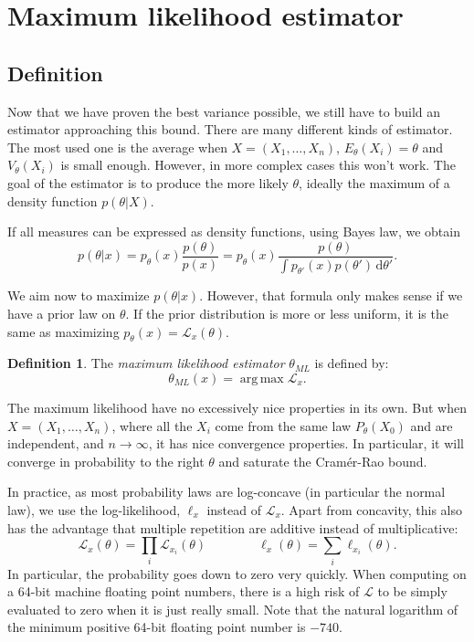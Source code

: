 \documentclass[10pt,a4paper]{report}
\theoremstyle{plain}
\theoremstyle{definition}
\newtheorem{defn}{Definition}[chapter]
\theoremstyle{remark}
\newcommand{\dd}{\mathrm{d}}
\DeclareMathOperator{\argmax}{arg\,max}
\newcommand{\ml}{_{M\!L}}
\begin{document}







\section{Maximum likelihood estimator}

\subsection{Definition}

Now that we have proven the best variance possible, we still have to build an
estimator approaching this bound. There are many different kinds of estimator. The
most used one is the average when $X = (X_1,\ldots,X_n)$,
$E_\theta(X_i) = \theta$ and $V_\theta(X_i)$ is small enough. However, in more
complex cases this won't work. The goal of the estimator is to produce the more
likely $\theta$, ideally the maximum of a density function $p(\theta | X)$.

If all measures can be expressed as density functions, using Bayes law, we obtain
\begin{equation}\label{eqn:bayes}
  p(\theta|x) = p_\theta(x) \frac {p(\theta)}{p(x)}
  = p_\theta(x) \frac {p(\theta)}{\int p_{\theta'}(x)p(\theta')\,\dd \theta'}.
\end{equation}

We aim now to maximize $p(\theta|x)$. However, that
formula only makes sense if we have a prior law on $\theta$. If the prior
distribution is more or less uniform, it is the same as maximizing $p_\theta(x)
= \mathcal{L}_x(\theta)$.

\begin{defn}
  The \emph{maximum likelihood estimator} $\theta\ml$ is defined by:
  \[\theta\ml(x) = \argmax \mathcal{L}_x.\]
\end{defn}

The maximum likelihood have no excessively nice properties in its own. But
when $X = (X_1,\ldots,X_n)$, where all the $X_i$ come from the same law
$P_\theta(X_0)$ and are independent, and $n \to \infty$,
it has nice convergence properties. In particular, it will converge in
probability to the right
$\theta$ and saturate the Cramér-Rao bound.
\

In practice, as most probability laws are log-concave (in particular the normal
law), we use the log-likelihood, $\ell_x$ instead of $\mathcal{L}_x$. Apart
from concavity, this also has the advantage that multiple repetition are
additive instead of multiplicative:
\[\mathcal{L}_x(\theta) = \prod_i \mathcal{L}_{x_i}(\theta) \quad \quad \quad
  \quad \ell_x(\theta) = \sum_i \ell_{x_i}(\theta).\]
In particular, the probability goes down to zero very quickly. When computing on
a 64-bit machine floating point numbers, there is a high risk of $\mathcal{L}$ to
be simply evaluated to zero when it is just really small. Note that the natural
logarithm of the minimum positive 64-bit floating point number is $-740$.
\end{document}
